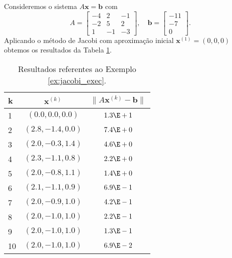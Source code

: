 \begin{ex}\label{ex:jacobi_exec}
  Consideremos o sistema $A\pmb{x} = \pmb{b}$ com
  \begin{equation}
    A =
    \begin{bmatrix}
      -4 & 2 & -1 \\
      -2 & 5 & 2 \\
       1 & -1 & -3
    \end{bmatrix},\quad
    \pmb{b} =
    \begin{bmatrix}
      -11\\ -7\\ 0
    \end{bmatrix}.
  \end{equation}
  Aplicando o método de Jacobi com aproximação inicial $\pmb{x}^{(1)} = (0, 0, 0)$ obtemos os resultados da Tabela \ref{tab:ex_jacobi_exec}.

  \begin{table}[h!]
    \centering
    \begin{tabular}{l|cc}
      k & $\pmb{x}^{(k)}$ & $\|A\pmb{x}^{(k)}-\pmb{b}\|$\\\hline
      1 & $(0.0, 0.0, 0.0)$ & $1.3\E+1$\\
      2 & $(2.8, -1.4, 0.0)$ & $7.4\E+0$ \\
      3 & $(2.0, -0.3, 1.4)$ & $4.6\E+0$ \\
      4 & $(2.3, -1.1, 0.8)$ & $2.2\E+0$ \\
      5 & $(2.0, -0.8, 1.1)$ & $1.4\E+0$ \\
      6 & $(2.1, -1.1, 0.9)$ & $6.9\E-1$ \\
      7 & $(2.0, -0.9, 1.0)$ & $4.2\E-1$ \\
      8 & $(2.0, -1.0, 1.0)$ & $2.2\E-1$ \\
      9 & $(2.0, -1.0, 1.0)$ & $1.3\E-1$ \\
      10 & $(2.0, -1.0, 1.0)$ & $6.9\E-2$ \\\hline
    \end{tabular}
    \caption{Resultados referentes ao Exemplo \ref{ex:jacobi_exec}.}
    \label{tab:ex_jacobi_exec}
  \end{table}

% 
\end{ex}

